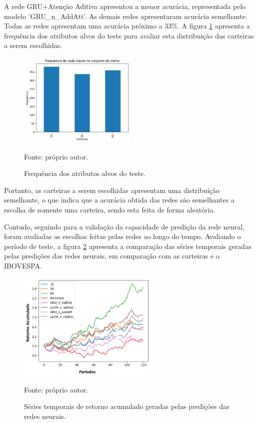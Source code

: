         \ipar A rede \acrshort{GRU}+Atenção Aditiva apresentou a menor acurácia, representada pelo modelo 'GRU\_n\_AddAtt'. As demais redes apresentaram acurácia semelhante. Todas as redes apresentam uma acurácia próximo a 33\%. A figura \ref{fig:freq} apresenta a frequência dos atributos alvos do teste para avaliar esta distribuição das carteiras a serem escolhidas.

        \begin{figure}[H]
            \centering
            \caption{Frequência dos atributos alvos do teste.}
            \label{fig:freq}
            \includegraphics[width=0.5\textwidth]{./imagens/freq.png}
            \par \footnotesize Fonte: próprio autor.
        \end{figure}

        \ipar Portanto, as carteiras a serem escolhidas apresentam uma distribuição semelhante, o que indica que a acurácia obtida das redes são semelhantes a escolha de somente uma carteira, sendo esta feita de forma aleatória.

        \ipar Contudo, seguindo para a validação da capacidade de predição da rede neural, foram avaliadas as escolhas feitas pelas redes ao longo do tempo. Avaliando o período de teste, a figura \ref{fig:backtest_ts} apresenta a comparação das séries temporais geradas pelas predições das redes neurais, em comparação com as carteiras e o \acrshort{IBOVESPA}.

        \begin{figure}[H]
            \centering
            \caption{Séries temporais de retorno acumulado geradas pelas predições das redes neurais.}
            \label{fig:backtest_ts}
            \includegraphics[width=0.6\textwidth]{./imagens/backtest_ts.png}
            \par \footnotesize Fonte: próprio autor.
        \end{figure}

